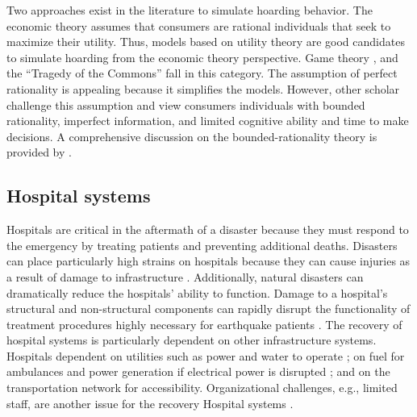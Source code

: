 Two approaches exist in the literature to simulate hoarding behavior. The economic theory assumes that consumers are rational individuals that seek to maximize their utility. Thus, models based on utility theory are good candidates to simulate hoarding from the economic theory perspective. Game theory \citep{hallsworth2000urban}, and the ``Tragedy of the Commons'' \citep{hardin2009tragedy} fall in this category. The assumption of perfect rationality is appealing because it simplifies the models. However, other scholar challenge this assumption and view consumers individuals with bounded rationality, imperfect information, and limited cognitive ability and time to make decisions. A comprehensive discussion on the bounded-rationality theory is provided by \cite{sep-bounded-rationality}. \

\subsection{Hospital systems}
Hospitals are critical in the aftermath of a disaster because they must respond to the emergency by treating patients and preventing additional deaths. Disasters can place particularly high strains on hospitals because they can cause injuries as a result of damage to infrastructure \citep{ceferino2018regional,ceferino2018probabilistic,johnston20142010,jun2010analysis}. Additionally, natural disasters can dramatically reduce the hospitals’ ability to function. Damage to a hospital's structural and non-structural components can rapidly disrupt the functionality of treatment procedures highly necessary for earthquake patients \citep{bambaren2011a3,mitrani2012functional}. The recovery of hospital systems is particularly dependent on other infrastructure systems. Hospitals dependent on utilities such as power and water to operate \citep{Chand2015, jacques2014resilience, Achour2014, Hiete2011, McDaniels2008}; on fuel for ambulances and power generation if electrical power is disrupted \citep{Hiete2011}; and on the transportation network for accessibility. Organizational challenges, e.g., limited staff, are another issue for the recovery Hospital systems \citep{Cimellaro2016}. \

